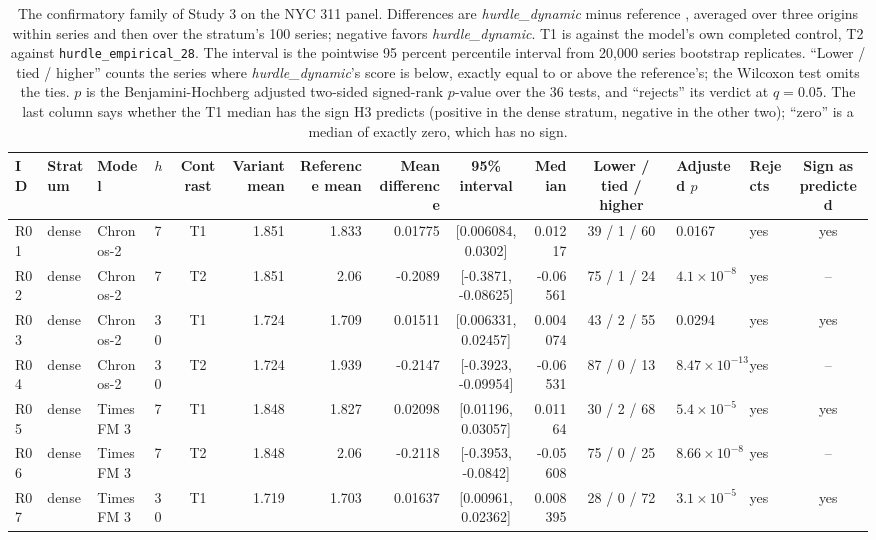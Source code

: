\begin{table}[t]
\centering\scriptsize\setlength{\tabcolsep}{2.4pt}
\caption{The confirmatory family of Study 3 on the NYC 311 panel. Differences are \emph{hurdle\_dynamic}
minus reference \qs{}, averaged over three origins within series and then over the stratum's 100 series;
negative favors \emph{hurdle\_dynamic}. T1 is against the model's own completed control, T2 against
\texttt{hurdle\_empirical\_28}. The interval is the pointwise 95 percent percentile interval from 20,000
series bootstrap replicates. ``Lower / tied / higher'' counts the series where \emph{hurdle\_dynamic}'s score
is below, exactly equal to or above the reference's; the Wilcoxon test omits the ties. $p$ is the
Benjamini-Hochberg adjusted two-sided signed-rank $p$-value over the 36 tests, and ``rejects'' its verdict
at $q = 0.05$. The last column says whether the T1 median has the sign H3 predicts (positive in the dense
stratum, negative in the other two); ``zero'' is a median of exactly zero, which has no sign.}
\label{tab:s3family}
\begin{tabular}{llllcrrrcrcllc}
\toprule
ID & Stratum & Model & $h$ & Contrast & Variant mean & Reference mean & Mean difference & 95\% interval & Median & Lower / tied / higher & Adjusted $p$ & Rejects & Sign as predicted \\
\midrule
R01 & dense & Chronos-2 & 7 & T1 & 1.851 & 1.833 & 0.01775 & [0.006084, 0.0302] & 0.01217 & 39 / 1 / 60 & 0.0167 & yes & yes \\
R02 & dense & Chronos-2 & 7 & T2 & 1.851 & 2.06 & -0.2089 & [-0.3871, -0.08625] & -0.06561 & 75 / 1 / 24 & $4.1 \times 10^{-8}$ & yes & -- \\
R03 & dense & Chronos-2 & 30 & T1 & 1.724 & 1.709 & 0.01511 & [0.006331, 0.02457] & 0.004074 & 43 / 2 / 55 & 0.0294 & yes & yes \\
R04 & dense & Chronos-2 & 30 & T2 & 1.724 & 1.939 & -0.2147 & [-0.3923, -0.09954] & -0.06531 & 87 / 0 / 13 & $8.47 \times 10^{-13}$ & yes & -- \\
R05 & dense & TimesFM 3 & 7 & T1 & 1.848 & 1.827 & 0.02098 & [0.01196, 0.03057] & 0.01164 & 30 / 2 / 68 & $5.4 \times 10^{-5}$ & yes & yes \\
R06 & dense & TimesFM 3 & 7 & T2 & 1.848 & 2.06 & -0.2118 & [-0.3953, -0.0842] & -0.05608 & 75 / 0 / 25 & $8.66 \times 10^{-8}$ & yes & -- \\
R07 & dense & TimesFM 3 & 30 & T1 & 1.719 & 1.703 & 0.01637 & [0.00961, 0.02362] & 0.008395 & 28 / 0 / 72 & $3.1 \times 10^{-5}$ & yes & yes \\

\end{tabular}
\end{table}
